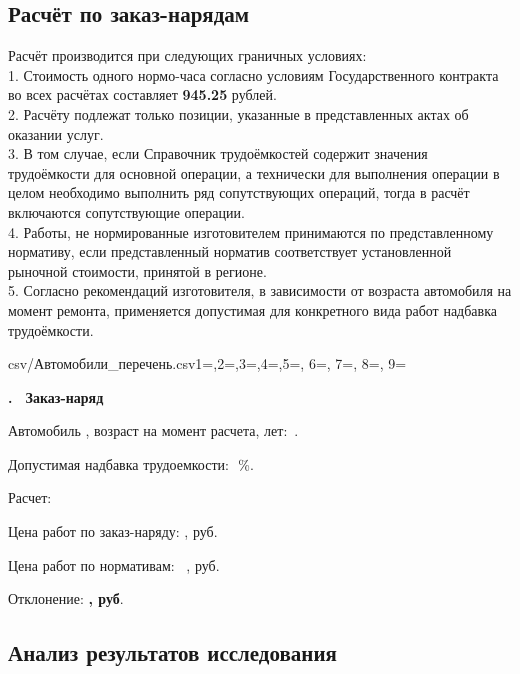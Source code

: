 \subsection{Расчёт по заказ-нарядам}

Расчёт производится при следующих граничных условиях:\\
1.  Стоимость одного нормо-часа согласно условиям Государственного контракта во всех расчётах  составляет \textbf{945.25} рублей.\\
2. Расчёту подлежат только позиции, указанные в представленных актах об оказании услуг.\\
3. В том случае, если Справочник трудоёмкостей содержит значения трудоёмкости для основной операции, а технически для выполнения операции в целом необходимо выполнить ряд сопутствующих операций, тогда в расчёт включаются сопутствующие операции.\\
4. Работы, не нормированные изготовителем принимаются по представленному нормативу, если представленный  норматив соответствует установленной рыночной стоимости, принятой в регионе.\\
5. Согласно рекомендаций изготовителя, в зависимости от возраста автомобиля на момент ремонта, применяется допустимая для конкретного вида работ надбавка трудоёмкости.

     



\csvreader[separator=semicolon, %
]
%
{csv/Автомобили_перечень.csv}{1=,2=,3=,4=,5=, 6=, 7=, 8=, 9=}%
{\begin{flushleft}\large\bfseries {}. \, Заказ-наряд   \end{flushleft}
	\large%
	Автомобиль , возраст  на момент расчета, лет:\,  .
	\par Допустимая надбавка трудоемкости:\, \,\%. 
	\par {Расчет:}
	\par Цена работ по заказ-наряду: , руб. 
	\par Цена работ по нормативам:\,\,\, , руб. 
	\par Отклонение:\hspace{34mm}  \textbf{, руб}.
\pagebreak
}%


\subsection{Анализ результатов исследования}

